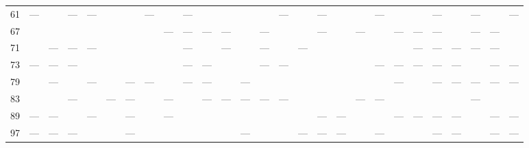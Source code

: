 \begin{landscape}
\begin{tabular}{r||*{26}{c|}}
61 & — &  & — & — &  &  & — &  & — &  &  &  &  & — &  & — &  &  & — &  &  & — &  & — &  & —\\
67 &  &  &  &  &  &  &  & — & — & — & — &  & — &  &  & — &  & — &  & — & — & — &  & — & — & \\
71 &  & — & — & — &  &  &  &  & — &  & — &  & — &  & — &  &  &  &  &  & — & — & — & — & — & \\
73 & — & — & — &  &  &  &  &  & — & — &  &  & — & — &  &  &  &  & — & — & — & — & — &  & — & —\\
79 &  & — &  & — &  & — & — &  & — & — &  & — &  &  &  &  &  &  &  & — &  & — & — & — & — & —\\
83 &  &  & — &  & — & — &  & — &  & — & — & — & — & — &  &  &  & — & — &  &  &  &  & — &  & \\
89 & — & — &  & — &  & — &  & — &  &  &  &  &  &  &  & — & — &  &  & — & — & — & — &  & — & —\\
97 & — & — & — &  &  & — &  &  &  &  &  & — &  &  & — & — & — &  & — &  &  & — & — &  & — & —\\
\hline\end{tabular}\par\endgroup\end{landscape}


